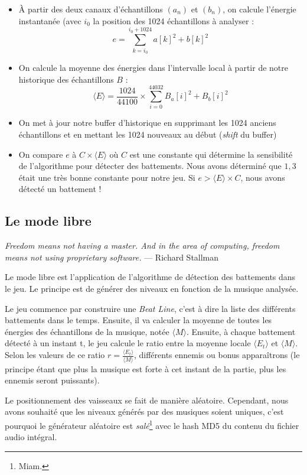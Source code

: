 \documentclass[12pt,a4paper]{article}
\begin{document}
	\begin{itemize}
	\item À partir des deux canaux d'échantillons $(a_n)$ et $(b_n)$, on calcule l'énergie instantanée (avec $i_0$ la position des 1024 échantillons à analyser :
	$$e = \sum_{k=i_0}^{i_0 + 1024} a[k]^2 + b[k]^2$$
	\item On calcule la moyenne des énergies dans l'intervalle local à partir de notre historique des échantillons $B$ :
	$$\langle E \rangle = \frac{1024}{44100} \times \sum_{i=0}^{44032} B_a[i]^2 + B_b[i]^2$$
	\item On met à jour notre buffer d'historique en supprimant les 1024 anciens échantillons et en mettant les 1024 nouveaux au début (\emph{shift} du buffer)
	\item On compare $e$ à $C \times \langle E \rangle $ où $C$ est une constante qui détermine la sensibilité de l'algorithme pour détecter des battements. Nous avons déterminé que $1,3$ était une très bonne constante pour notre jeu. Si $e > \langle E \rangle \times C$, nous avons détecté un battement !
	\end{itemize}
	\subsection{Le mode libre}	
	\par \emph{Freedom means not having a master. And in the area of computing, freedom means not using proprietary software.} --- Richard Stallman
	\vspace{0.8cm}
	\par Le mode libre est l'application de l'algorithme de détection des battements dans le jeu. Le principe est de générer des niveaux en fonction de la musique analysée.
	\par Le jeu commence par construire une \emph{Beat Line}, c'est à dire la liste des différents battements dans le temps. Ensuite, il va calculer la moyenne de toutes les énergies des échantillons de la musique, notée $\langle M \rangle$. Ensuite, à chaque battement détecté à un instant t, le jeu calcule le ratio entre la moyenne locale $\langle E_t \rangle$ et $\langle M \rangle$. Selon les valeurs de ce ratio $r = \frac{\langle E_t \rangle}{\langle M \rangle}$, différents ennemis ou bonus apparaîtrons (le principe étant que plus la musique est forte à cet instant de la partie, plus les ennemis seront puissants).
	\par Le positionnement des vaisseaux se fait de manière aléatoire. Cependant, nous avons souhaité que les niveaux générés par des musiques soient uniques, c'est pourquoi le générateur aléatoire est \emph{salé}\footnote{Miam.} avec le hash MD5 du contenu du fichier audio intégral.
	
\end{document}
